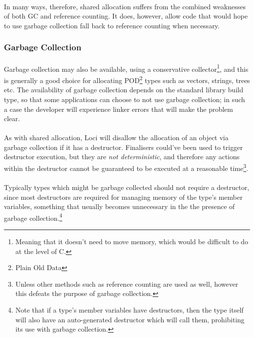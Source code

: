 \documentclass[12pt,twoside,notitlepage]{report}
\begin{document}
\paragraph{}
In many ways, therefore, shared allocation suffers from the combined weaknesses of both GC and reference counting. It does, however, allow code that would hope to use garbage collection fall back to reference counting when necessary.

\subsubsection{Garbage Collection}

\paragraph{}
Garbage collection may also be available, using a conservative collector\footnote{Meaning that it doesn't need to move memory, which would be difficult to do at the level of C.}, and this is generally a good choice for allocating POD\footnote{Plain Old Data} types such as vectors, strings, trees etc. The availability of garbage collection depends on the standard library build type, so that some applications can choose to not use garbage collection; in such a case the developer will experience linker errors that will make the problem clear.

\paragraph{}
As with shared allocation, Loci will disallow the allocation of an object via garbage collection if it has a destructor. Finalisers could've been used to trigger destructor execution, but they are \emph{not deterministic}, and therefore any actions within the destructor cannot be guaranteed to be executed at a reasonable time\footnote{Unless other methods such as reference counting are used as well, however this defeats the purpose of garbage collection.}.

\paragraph{}
Typically types which might be garbage collected should not require a destructor, since most destructors are required for managing memory of the type's member variables, something that usually becomes unnecessary in the the presence of garbage collection.\footnote{Note that if a type's member variables have destructors, then the type itself will also have an auto-generated destructor which will call them, prohibiting its use with garbage collection.}
\end{document}

